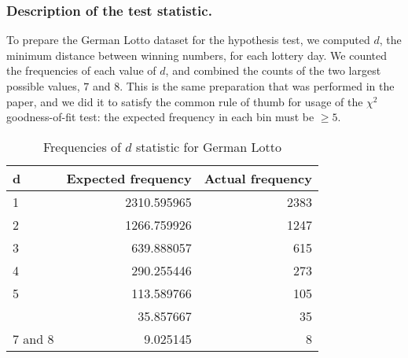 \subsubsection{Description of the test statistic.}



To prepare the German Lotto dataset for the hypothesis test, we computed $d$, the minimum distance between winning numbers, for each 
lottery day. We counted the frequencies of each value of $d$, and combined the counts of the 
two largest possible values, $7$ and $8$. This is the same preparation that was performed in the paper,
and we did it to satisfy the common rule of thumb for usage of the 
$\chi^2$ goodness-of-fit test: the expected frequency in each bin must be $\geq 5$.

\begin{table}

    \caption{Frequencies of $d$ statistic for German Lotto}
    \centering
    \begin{tabular}[t]{lrr}
    \toprule
    d & Expected frequency & Actual frequency\\
    \midrule
    1 & 2310.595965 & 2383\\
    2 & 1266.759926 & 1247\\
    3 & 639.888057 & 615\\
    4 & 290.255446 & 273\\
    5 & 113.589766 & 105\\
    \addlinespace
    6 & 35.857667 & 35\\
    7 and 8 & 9.025145 & 8\\
    \bottomrule
    \end{tabular}
    \end{table}



